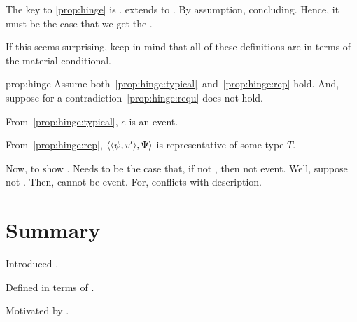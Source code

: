 \begin{note}
  The key to \autoref{prop:hinge} is .
  \tC{} extends \tC{} to .
  By assumption, concluding.
  Hence, it must be the case that we get the \fc{}.

  If this seems surprising, keep in mind that all of these definitions are in terms of the material conditional.

  \begin{argument}{prop:hinge}
    Assume both~\ref{prop:hinge:typical}~and~\ref{prop:hinge:rep} hold.
    And, suppose for a contradiction~\ref{prop:hinge:requ} does not hold.

    From~\ref{prop:hinge:typical}, \(e\) is an event.

    From~\ref{prop:hinge:rep}, \(\langle \langle \psi, v' \rangle, \Psi \rangle\) is representative of some type \(T\).

    Now, to show \requ{}.
    Needs to be the case that, if not \fc{}, then not event.
    Well, suppose not \fc{}.
    Then, cannot be event.
    For, conflicts with description.
  \end{argument}
\end{note}

\section*{Summary}

\begin{note}
  Introduced .

  Defined in terms of \tC{}.

  Motivated by \tC{}.
\end{note}







